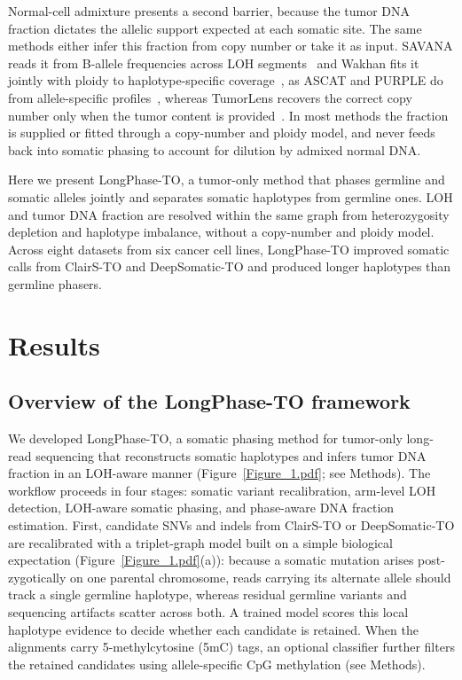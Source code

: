 \documentclass[pdflatex,sn-nature]{sn-jnl}
\begin{document}
Normal-cell admixture presents a second barrier, because the tumor DNA fraction dictates the allelic support expected at each somatic site. The same methods either infer this fraction from copy number or take it as input. SAVANA reads it from B-allele frequencies across LOH segments~\cite{elrick2025} and Wakhan fits it jointly with ploidy to haplotype-specific coverage~\cite{ahmad2025}, as ASCAT and PURPLE do from allele-specific profiles~\cite{vanloo2010,priestley2019}, whereas TumorLens recovers the correct copy number only when the tumor content is provided~\cite{paulin2026}. In most methods the fraction is supplied or fitted through a copy-number and ploidy model, and never feeds back into somatic phasing to account for dilution by admixed normal DNA.

Here we present LongPhase-TO, a tumor-only method that phases germline and somatic alleles jointly and separates somatic haplotypes from germline ones. LOH and tumor DNA fraction are resolved within the same graph from heterozygosity depletion and haplotype imbalance, without a copy-number and ploidy model. Across eight datasets from six cancer cell lines, LongPhase-TO improved somatic calls from ClairS-TO and DeepSomatic-TO and produced longer haplotypes than germline phasers.

\section{Results}\label{results}

\subsection{Overview of the LongPhase-TO framework}
We developed LongPhase-TO, a somatic phasing method for tumor-only long-read sequencing that reconstructs somatic haplotypes and infers tumor DNA fraction in an LOH-aware manner (Figure~\ref{Figure_1.pdf}; see Methods). The workflow proceeds in four stages: somatic variant recalibration, arm-level LOH detection, LOH-aware somatic phasing, and phase-aware DNA fraction estimation. First, candidate SNVs and indels from ClairS-TO or DeepSomatic-TO are recalibrated with a triplet-graph model built on a simple biological expectation (Figure~\ref{Figure_1.pdf}(a)): because a somatic mutation arises post-zygotically on one parental chromosome, reads carrying its alternate allele should track a single germline haplotype, whereas residual germline variants and sequencing artifacts scatter across both. A trained model scores this local haplotype evidence to decide whether each candidate is retained. When the alignments carry 5-methylcytosine (5mC) tags, an optional classifier further filters the retained candidates using allele-specific CpG methylation (see Methods).
\end{document}
